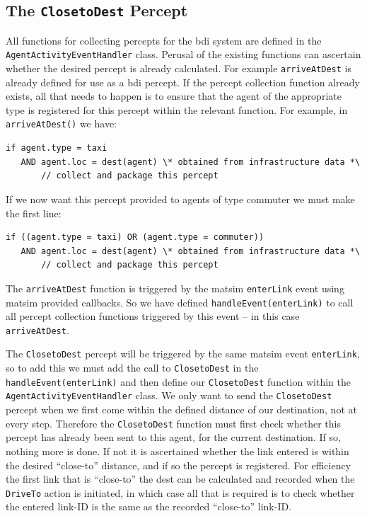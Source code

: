 \subsection{The \lstinline{ClosetoDest} Percept}
All functions for collecting percepts for the \gls{bdi} system are defined
in the \lstinline{AgentActivityEventHandler} class. Perusal of the existing
functions can ascertain whether the desired percept is already
calculated. For example \lstinline{arriveAtDest} is already defined for use as a
\gls{bdi} percept. 
%
If the percept collection function already exists, all that needs to
happen is to ensure that the agent of the appropriate type is
registered for this percept within the relevant function.
For example, in \lstinline{arriveAtDest()} we have:
\begin{lstlisting}
if agent.type = taxi
   AND agent.loc = dest(agent) \* obtained from infrastructure data *\
       // collect and package this percept
\end{lstlisting}
If we now want this percept provided to agents of type commuter we
must make the first line:
\begin{lstlisting}
if ((agent.type = taxi) OR (agent.type = commuter))
   AND agent.loc = dest(agent) \* obtained from infrastructure data *\
       // collect and package this percept
\end{lstlisting}

The \lstinline{arriveAtDest} function is triggered by the \gls{matsim}
\lstinline{enterLink} event using \gls{matsim} provided callbacks. So
we have defined \lstinline{handleEvent(enterLink)} to call all percept
  collection functions triggered by this event -- in this case
  \lstinline{arriveAtDest}. 

The \lstinline{ClosetoDest} percept will be triggered by the same \gls{matsim}
event \lstinline{enterLink}, so to add this we must add the call to
\lstinline{ClosetoDest} in the \lstinline{handleEvent(enterLink)} and then
  define our \lstinline{ClosetoDest} function within the
  \lstinline{AgentActivityEventHandler} class.  We only want to send the
  \lstinline{ClosetoDest} percept when we first come within the defined
  distance of our destination, not at every step. Therefore the
  \lstinline{ClosetoDest} function must first check whether this percept
  has already been sent to this agent, for the current destination. If
  so, nothing more is done. If not it is ascertained whether the link
  entered is within the desired ``close-to'' distance, and if so the
  percept is registered. For efficiency the first link that
    is ``close-to'' the dest can be calculated and recorded when the
    \lstinline{DriveTo} action is initiated, in which case all that is required is
    to check whether the entered link-ID is the same as the recorded
    ``close-to'' link-ID.

